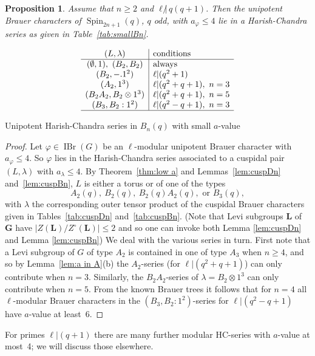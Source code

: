 \documentclass[12pt,leqno,a4paper]{amsart}
\newcommand{\bG}{{\mathbf{G}}}
\newcommand{\bL}{{\mathbf{L}}}
\newcommand{\IBr}{{\operatorname{IBr}}}
\newcommand{\Spin}{{\operatorname{Spin}}}
\let\la=\lambda
\let\vhi=\varphi
\newtheorem{prop}[thm]{Proposition}
\theoremstyle{remark}
\begin{document}
\begin{prop}   \label{prop:HC Bn}
 Assume that $n\ge2$ and $\ell{\not|}\,q(q+1)$. Then the unipotent Brauer
 characters of $\Spin_{2n+1}(q)$, $q$ odd, with $a_\vhi\le4$ lie in a
 Harish-Chandra series as given in Table~\ref{tab:smallBn}.
\end{prop}

\begin{table}[ht]
\[\begin{array}{c|l}
 (L,\la)& \text{conditions}\\
\hline
 (\emptyset,1),\ (B_2,B_2)& \text{always}\\
 (B_2,-.1^2)& \ell|(q^2+1)\\
 (A_2,1^3)& \ell|(q^2+q+1),\ n=3\\
 (B_2A_2,B_2\otimes 1^3)& \ell|(q^2+q+1),\ n=5\\
 (B_3,B_2:1^2)& \ell|(q^2-q+1),\ n=3\\
\hline
\end{array}\]
\caption{Unipotent Harish-Chandra series in $B_n(q)$ with small $a$-value}   \label{tab:smallBn}
\end{table}

\begin{proof}
Let $\vhi\in\IBr(G)$ be an $\ell$-modular unipotent Brauer character with
$a_\vhi\le 4$. So $\vhi$ lies in the Harish-Chandra series associated to a
cuspidal pair $(L,\la)$ with $a_\la\le4$. By Theorem~\ref{thm:low a} and
Lemmas~\ref{lem:cuspDn} and~\ref{lem:cuspBn}, $L$ is either a torus or of one
of the types
$$A_2(q),\ B_2(q),\ B_2(q)A_2(q),\text{ or } B_3(q),$$
with $\la$ the corresponding outer tensor product of the cuspidal Brauer
characters given in Tables~\ref{tab:cuspDn} and~\ref{tab:cuspBn}. (Note that
Levi subgroups $\bL$ of $\bG$ have $|Z(\bL)/Z^\circ(\bL)|\le2$ and so one
can invoke both Lemma \ref{lem:cuspDn} and Lemma \ref{lem:cuspBn})
We deal with the various series in turn. First note that a Levi subgroup of
$G$ of type $A_2$ is contained in one of type $A_3$ when $n\ge4$, and so by
Lemma~\ref{lem:a in A}(b) the $A_2$-series (for $\ell|(q^2+q+1)$) can only
contribute when $n=3$. Similarly, the $B_2A_2$-series of $\la=B_2\otimes 1^3$
can only contribute when $n=5$. From the known Brauer trees it follows that
for $n=4$ all $\ell$-modular Brauer characters in the $(B_3,B_2:1^2)$-series
for $\ell|(q^2-q+1)$ have $a$-value at least~6.
\end{proof}

For primes $\ell|(q+1)$ there are many further modular HC-series with
$a$-value at most~4; we will discuss those elsewhere.
\end{document}
